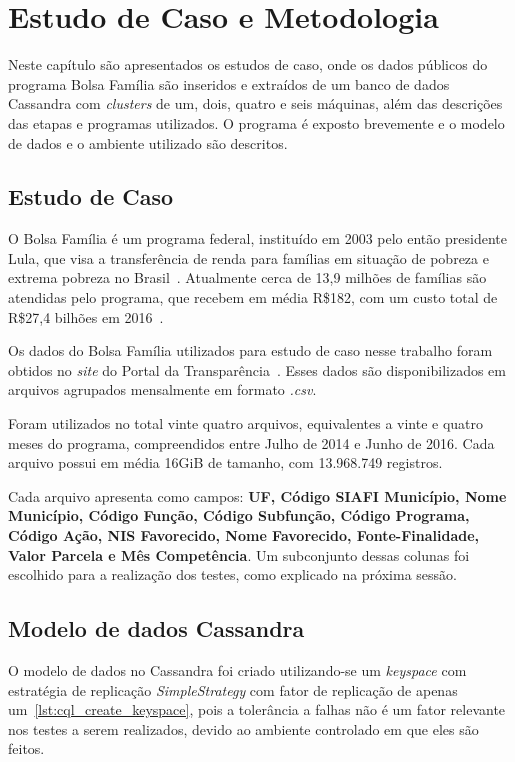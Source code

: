 

\chapter{Estudo de Caso e Metodologia}

Neste capítulo são apresentados os estudos de caso, onde os dados públicos do programa Bolsa Família são inseridos e extraídos de um banco de dados Cassandra com \emph{clusters} de um, dois, quatro e seis máquinas, além das descrições das etapas e programas utilizados. O programa é exposto brevemente e o modelo de dados e o ambiente utilizado são descritos.

\section{Estudo de Caso}
O Bolsa Família é um programa federal, instituído em 2003 pelo então presidente Lula, que visa a transferência de renda para famílias em situação de pobreza e extrema pobreza no Brasil~\cite{caixa-bolsafamilia}. Atualmente cerca de 13,9 milhões de famílias são atendidas pelo programa, que recebem em média R\$182, com um custo total de R\$27,4 bilhões em 2016~\cite{gov-bolsafamilia1, gov-bolsafamilia2}.

Os dados do Bolsa Família utilizados para estudo de caso nesse trabalho foram obtidos no \emph{site} do Portal da Transparência~\cite{portaldatransparencia}. Esses dados são disponibilizados em arquivos agrupados mensalmente em formato \emph{.csv}. 

Foram utilizados no total vinte quatro arquivos, equivalentes a vinte e quatro meses do programa, compreendidos entre Julho de 2014 e Junho de 2016. Cada arquivo possui em média 16GiB de tamanho, com 13.968.749 registros.

Cada arquivo apresenta como campos: \textbf{UF, Código SIAFI Município, Nome Município, Código Função, Código Subfunção, Código Programa, Código Ação, NIS Favorecido, Nome Favorecido, Fonte-Finalidade, Valor Parcela e Mês Competência}. Um subconjunto dessas colunas foi escolhido para a realização dos testes, como explicado na próxima sessão.

\section{Modelo de dados Cassandra}
O modelo de dados no Cassandra foi criado utilizando-se um \emph{keyspace} com estratégia de replicação \emph{SimpleStrategy} com fator de replicação de apenas um~\ref{lst:cql_create_keyspace}, pois a tolerância a falhas não é um fator relevante nos testes a serem realizados, devido ao ambiente controlado em que eles são feitos.

